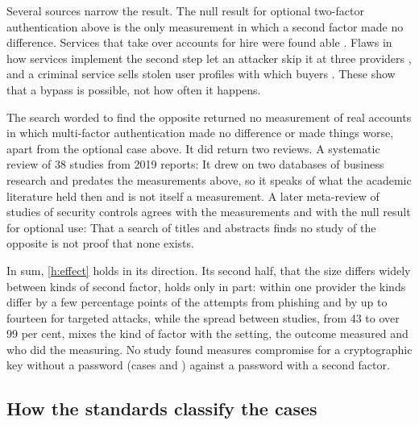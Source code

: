 Several sources narrow the result.
The null result for optional two-factor authentication above is the only
measurement in which a second factor made no difference.
Services that take over accounts for hire were found able
.
Flaws in how services implement the second step let an attacker skip it
at three providers \autocite{Wang2024SimpleNotSecure}, and a criminal
service sells stolen user profiles with which buyers
.
These show that a bypass is possible, not how often it happens.

The search worded to find the opposite returned no measurement of real
accounts in which multi-factor authentication made no difference or made
things worse, apart from the optional case above.
It did return two reviews.
A systematic review of 38 studies from 2019 reports:
It drew on two databases of business research and predates the
measurements above, so it speaks of what the academic literature held
then and is not itself a measurement.
A later meta-review of studies of security controls agrees with the
measurements and with the null result for optional use:
That a search of titles and abstracts finds no study of the opposite is
not proof that none exists.

In sum, \cref{h:effect} holds in its direction.
Its second half, that the size differs widely between kinds of second
factor, holds only in part: within one provider the kinds differ by a
few percentage points of the attempts from phishing and by up to
fourteen for targeted attacks, while the spread between studies,
from 43 to over 99 per cent, mixes the kind of factor with the setting,
the outcome measured and who did the measuring.
No study found measures compromise for a cryptographic key without a
password (cases  and ) against a password with a second
factor.

\subsection{How the standards classify the cases}\label{sec:res-standards}


